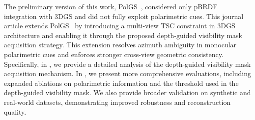 The preliminary version of this work, PolGS~\citep{han2025polgs}, considered only pBRDF integration with 3DGS and did not fully exploit polarimetric cues. 
This journal article extends PolGS~\citep{han2025polgs} by introducing a multi-view TSC constraint in 3DGS architecture and enabling it through the proposed depth-guided visibility mask acquisition strategy. 
This extension resolves azimuth ambiguity in monocular polarimetric cues and enforces stronger cross-view geometric consistency. 
Specifically, in , we provide a detailed analysis of the depth-guided visibility mask acquisition mechanism. 
In , we present more comprehensive evaluations, including expanded ablations on polarimetric information and the threshold used in the depth-guided visibility mask. We also provide broader validation on synthetic and real-world datasets, demonstrating improved robustness and reconstruction quality.


